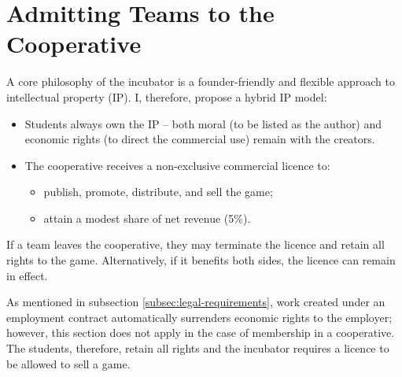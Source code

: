 \section{Admitting Teams to the Cooperative}
A core philosophy of the incubator is a founder-friendly and flexible approach to intellectual property (IP). I, therefore, propose a hybrid IP model:
\begin{itemize}
    \item Students always own the IP – both moral (to be listed as the author) and economic rights (to direct the commercial use) remain with the creators.
    \item The cooperative receives a non-exclusive commercial licence to:
    \begin{itemize}
        \item publish, promote, distribute, and sell the game;
        \item attain a modest share of net revenue (5\%).
    \end{itemize}
\end{itemize}
If a team leaves the cooperative, they may terminate the licence and retain all rights to the game. Alternatively, if it benefits both sides, the licence can remain in effect.

As mentioned in subsection \ref{subsec:legal-requirements}, work created under an employment contract automatically surrenders economic rights to the employer; however, this section does not apply in the case of membership in a cooperative. The students, therefore, retain all rights and the incubator requires a licence to be allowed to sell a game.


